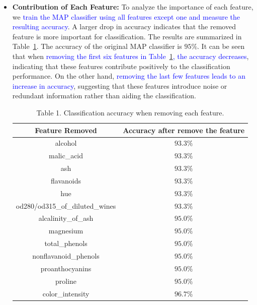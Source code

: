 \begin{itemize}
    \item \textbf{Contribution of Each Feature:}  
    To analyze the importance of each feature, we \textcolor{blue}{train the MAP classifier using all 
    features except one and measure the resulting accuracy}. A larger drop in accuracy indicates that
    the removed feature is more important for classification. The results are summarized in 
    Table~\ref{tab:feature_contribution}. The accuracy of the original MAP classifier is $95\%$.  
    It can be seen that when \textcolor{blue}{removing the first six features in Table~\ref{tab:feature_contribution}, 
    the accuracy decreases}, indicating that these features contribute positively to the classification 
    performance. On the other hand, \textcolor{blue}{removing the last few features leads to an increase
    in accuracy}, suggesting that these features introduce noise or redundant information rather than 
    aiding the classification.
    \begin{table}[h]
        \centering
        \begin{tabular}{|c|c|}
            \hline 
            \textbf{Feature Removed} & \textbf{Accuracy after remove the feature} \\ 
            \hline
            alcohol                         & $93.3\%$ \\  
            \hline 
            malic\_acid                     & $93.3\%$ \\  
            \hline 
            ash                             & $93.3\%$ \\
            \hline
            flavanoids                      & $93.3\%$ \\
            \hline
            hue                             & $93.3\%$ \\
            \hline
            od280/od315\_of\_diluted\_wines  & $93.3\%$ \\ 
            \hline 
            alcalinity\_of\_ash             & $95.0\%$ \\ 
            \hline
            magnesium                       & $95.0\%$ \\  
            \hline
            total\_phenols                   & $95.0\%$ \\  
            \hline
            nonflavanoid\_phenols            & $95.0\%$ \\  
            \hline
            proanthocyanins                 & $95.0\%$ \\  
            \hline
            proline                         & $95.0\%$ \\  
            \hline
            color\_intensity                 & $96.7\%$ \\  
            \hline
        \end{tabular}
        \caption{Table 1. Classification accuracy when removing each feature.}
        \label{tab:feature_contribution}
    \end{table}


    
\end{itemize}
